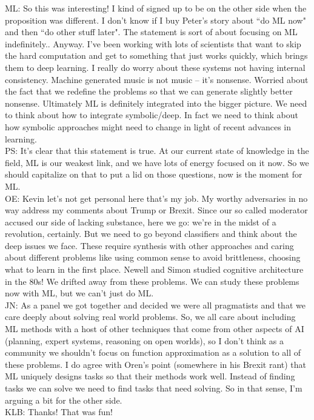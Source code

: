 ML: So this was interesting! I kind of signed up to be on the other side when the proposition was different. I don't know if I buy Peter's story about ``do ML now" and then ``do other stuff later". The statement is sort of about focusing on ML indefinitely.. Anyway. I've been working with lots of scientists that want to skip the hard computation and get to something that just works quickly, which brings them to deep learning. I really do worry about these systems not having internal consistency. Machine generated music is not music -- it's nonsense. Worried about the fact that we redefine the problems so that we can generate slightly better nonsense. Ultimately ML is definitely integrated into the bigger picture. We need to think about how to integrate symbolic/deep. In fact we need to think about how symbolic approaches might need to change in light of recent advances in learning. \\

PS: It's clear that this statement is true. At our current state of knowledge in the field, ML is our weakest link, and we have lots of energy focused on it now. So we should capitalize on that to put a lid on those questions, now is the moment for ML. \\

OE: Kevin let's not get personal here that's my job. My worthy adversaries in no way address my comments about Trump or Brexit. Since our so called moderator accused our side of lacking substance, here we go: we're in the midst of a revolution, certainly. But we need to go beyond classifiers and think about the deep issues we face. These require synthesis with other approaches and caring about different problems like using common sense to avoid brittleness, choosing what to learn in the first place. Newell and Simon studied cognitive architecture in the 80s! We drifted away from these problems. We can study these problems now with ML, but we can't just do ML. \\

JN: As a panel we got together and decided we were all pragmatists and that we care deeply about solving real world problems. So, we all care about including ML methods with a host of other techniques that come from other aspects of AI (planning, expert systems, reasoning on open worlds), so I don't think as a community we shouldn't focus on function approximation as a solution to all of these problems. I do agree with Oren's point (somewhere in his Brexit rant) that ML uniquely designs tasks so that their methods work well. Instead of finding tasks we can solve we need to find tasks that need solving. So in that sense, I'm arguing a bit for the other side. \\

KLB: Thanks! That was fun!

\spacerule